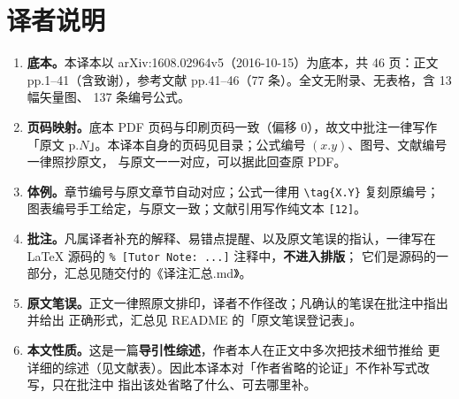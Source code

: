 \section*{译者说明}
\begin{enumerate}[leftmargin=2em,itemsep=2pt]
\item \textbf{底本。}本译本以 arXiv:1608.02964v5（2016-10-15）为底本，共 46 页：正文
  pp.1--41（含致谢），参考文献 pp.41--46（77 条）。全文无附录、无表格，含 13 幅矢量图、
  137 条编号公式。
\item \textbf{页码映射。}底本 PDF 页码与印刷页码一致（偏移 0），故文中批注一律写作
  「原文 p.$N$」。本译本自身的页码见目录；公式编号 $(x.y)$、图号、文献编号一律照抄原文，
  与原文一一对应，可以据此回查原 PDF。
\item \textbf{体例。}章节编号与原文章节自动对应；公式一律用 \verb|\tag{X.Y}| 复刻原编号；
  图表编号手工给定，与原文一致；文献引用写作纯文本 \verb|[12]|。
\item \textbf{批注。}凡属译者补充的解释、易错点提醒、以及原文笔误的指认，一律写在
  \LaTeX{} 源码的 \verb|% [Tutor Note: ...]| 注释中，\textbf{不进入排版}；
  它们是源码的一部分，汇总见随交付的《译注汇总.md》。
\item \textbf{原文笔误。}正文一律照原文排印，译者不作径改；凡确认的笔误在批注中指出并给出
  正确形式，汇总见 README 的「原文笔误登记表」。
\item \textbf{本文性质。}这是一篇\textbf{导引性综述}，作者本人在正文中多次把技术细节推给
  更详细的综述（见文献表）。因此本译本对「作者省略的论证」不作补写式改写，只在批注中
  指出该处省略了什么、可去哪里补。
\end{enumerate}

\clearpage
